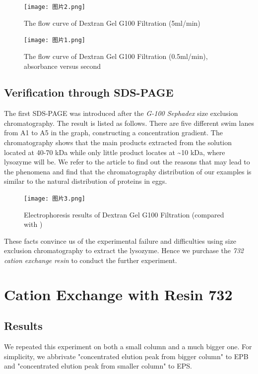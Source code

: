 \begin{figure}[!h]
	\centering
	\texttt{[image: 图片2.png]}
	\caption{The flow curve of Dextran Gel G100 Filtration (5ml/min)}
	\label{fig:g1001}
\end{figure}

\begin{figure}[!h]
	\centering
	\texttt{[image: 图片1.png]}
	\caption{The flow curve of Dextran Gel G100 Filtration (0.5ml/min), absorbance versus second}
	\label{fig:g1002}
\end{figure}

\subsection{Verification through SDS-PAGE}

The first SDS-PAGE was introduced after the \emph{G-100 Sephadex} size
exclusion chromatography. The result is listed as follows. There are
five different swim lanes from A1 to A5 in the graph, constructing a
concentration gradient. The chromatography shows that the main products
extracted from the solution located at 40-70 kDa while only little
product locates at \textasciitilde{}10 kDa, where lysozyme will be. We refer to the article to find out the reasons that may lead to the phenomena and find that the chromatography distribution of our examples is similar to the natural distribution of proteins in
eggs.

\begin{figure}[!h]
	\centering
	\texttt{[image: 图片3.png]}
	\caption{Electrophoresis results of Dextran Gel G100 Filtration (compared with \citet{Liu2020})}
	\label{fig:g100}
\end{figure}

These facts convince us of the experimental failure and difficulties
using size exclusion chromatography to extract the lysozyme. Hence we
purchase the \emph{732 cation exchange resin} to conduct the further
experiment.

\section{Cation Exchange with Resin 732}

\subsection{Results}
We repeated this experiment on both a small column and a much bigger one. For simplicity, we abbrivate "concentrated elution peak from bigger column" to EPB and "concentrated elution peak from smaller column" to EPS.

